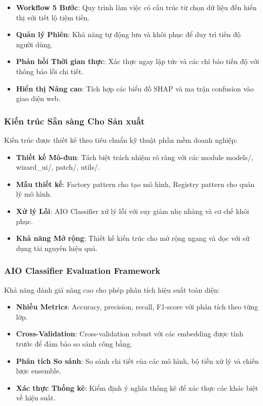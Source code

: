 \begin{itemize}
    \item \textbf{Workflow 5 Bước}: Quy trình làm việc có cấu trúc từ chọn dữ liệu đến hiển thị với tiết lộ tiệm tiến.
    \item \textbf{Quản lý Phiên}: Khả năng tự động lưu và khôi phục để duy trì tiến độ người dùng.
    \item \textbf{Phản hồi Thời gian thực}: Xác thực ngay lập tức và các chỉ báo tiến độ với thông báo lỗi chi tiết.
    \item \textbf{Hiển thị Nâng cao}: Tích hợp các biểu đồ SHAP và ma trận confusion vào giao diện web.
\end{itemize}

\subsubsection{Kiến trúc Sẵn sàng Cho Sản xuất}

Kiến trúc được thiết kế theo tiêu chuẩn kỹ thuật phần mềm doanh nghiệp:

\begin{itemize}
    \item \textbf{Thiết kế Mô-đun}: Tách biệt trách nhiệm rõ ràng với các module models/, wizard\_ui/, patch/, utils/.
    \item \textbf{Mẫu thiết kế}: Factory pattern cho tạo mô hình, Registry pattern cho quản lý mô hình.
    \item \textbf{Xử lý Lỗi}: AIO Classifier xử lý lỗi với suy giảm nhẹ nhàng và cơ chế khôi phục.
    \item \textbf{Khả năng Mở rộng}: Thiết kế kiến trúc cho mở rộng ngang và dọc với sử dụng tài nguyên hiệu quả.
\end{itemize}

\subsubsection{AIO Classifier Evaluation Framework}

Khả năng đánh giá nâng cao cho phép phân tích hiệu suất toàn diện:

\begin{itemize}
    \item \textbf{Nhiều Metrics}: Accuracy, precision, recall, F1-score với phân tích theo từng lớp.
    \item \textbf{Cross-Validation}: Cross-validation robust với các embedding được tính trước để đảm bảo so sánh công bằng.
    \item \textbf{Phân tích So sánh}: So sánh chi tiết của các mô hình, bộ tiền xử lý và chiến lược ensemble.
    \item \textbf{Xác thực Thống kê}: Kiểm định ý nghĩa thống kê để xác thực các khác biệt về hiệu suất.
\end{itemize}